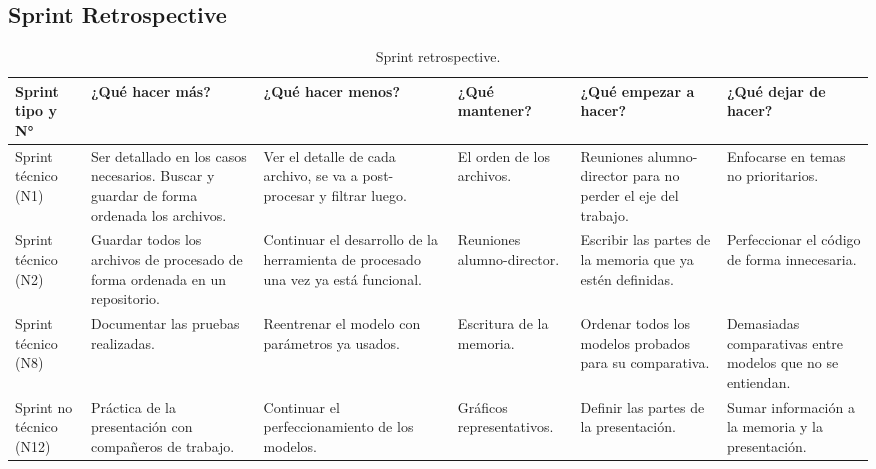 \documentclass[
11pt, %
]{charter}
\begin{document}
\begin{landscape}
\newpage
\section{Sprint Retrospective}    
\label{sec:sprint_retro}

\begin{table}[htpb]
\centering
\caption{Sprint retrospective.}
\label{tab:sprint_retrospective}
\begin{tabular}{p{2.5cm}p{3.5cm}p{3.5cm}p{3.5cm}p{3.5cm}p{3.5cm}}
\hline
\rowcolor[HTML]{cccccc}
\textbf{Sprint tipo y N°} & \textbf{¿Qué hacer más?} & \textbf{¿Qué hacer menos?} & \textbf{¿Qué mantener?} & \textbf{¿Qué empezar a hacer?} & \textbf{¿Qué dejar de hacer?} \\ \hline
Sprint técnico (N1) & Ser detallado en los casos necesarios. Buscar y guardar de forma ordenada los archivos. & Ver el detalle de cada archivo, se va a post-procesar y filtrar luego. & El orden de los archivos. & Reuniones alumno-director para no perder el eje del trabajo. & Enfocarse en temas no prioritarios. \\ \hline
Sprint técnico (N2) & Guardar todos los archivos de procesado de forma ordenada en un repositorio. & Continuar el desarrollo de la herramienta de procesado una vez ya está funcional. & Reuniones alumno-director. & Escribir las partes de la memoria que ya estén definidas. & Perfeccionar el código de forma innecesaria. \\ \hline
Sprint técnico (N8) & Documentar las pruebas realizadas. & Reentrenar el modelo con parámetros ya usados. & Escritura de la memoria. & Ordenar todos los modelos probados para su comparativa. & Demasiadas comparativas entre modelos que no se entiendan. \\ \hline
Sprint no técnico (N12) & Práctica de la presentación con compañeros de trabajo. & Continuar el perfeccionamiento de los modelos. & Gráficos representativos. & Definir las partes de la presentación. & Sumar información a la memoria y la presentación. \\ \hline
\end{tabular}%
\end{table}
\end{landscape}
\end{document}
